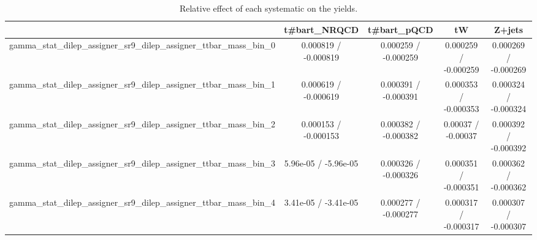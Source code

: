 \documentclass[10pt]{article}
\begin{document}
\begin{table}[htbp]
\begin{center}
\begin{tabular}{|c|c|c|c|c|}
\hline 
      & t#bar{t}_{NRQCD}      & t#bar{t}_{pQCD}      & tW      & Z+jets \\ 
\hline 
  gamma_stat_dilep_assigner_sr9_dilep_assigner_ttbar_mass_bin_0 & 0.000819 / -0.000819 & 0.000259 / -0.000259 & 0.000259 / -0.000259 & 0.000269 / -0.000269 \\ 
  gamma_stat_dilep_assigner_sr9_dilep_assigner_ttbar_mass_bin_1 & 0.000619 / -0.000619 & 0.000391 / -0.000391 & 0.000353 / -0.000353 & 0.000324 / -0.000324 \\ 
  gamma_stat_dilep_assigner_sr9_dilep_assigner_ttbar_mass_bin_2 & 0.000153 / -0.000153 & 0.000382 / -0.000382 & 0.00037 / -0.00037 & 0.000392 / -0.000392 \\ 
  gamma_stat_dilep_assigner_sr9_dilep_assigner_ttbar_mass_bin_3 & 5.96e-05 / -5.96e-05 & 0.000326 / -0.000326 & 0.000351 / -0.000351 & 0.000362 / -0.000362 \\ 
  gamma_stat_dilep_assigner_sr9_dilep_assigner_ttbar_mass_bin_4 & 3.41e-05 / -3.41e-05 & 0.000277 / -0.000277 & 0.000317 / -0.000317 & 0.000307 / -0.000307 \\ 
\hline 
\end{tabular} 
\caption{Relative effect of each systematic on the yields.} 
\end{center} 
\end{table} 
\end{document}
